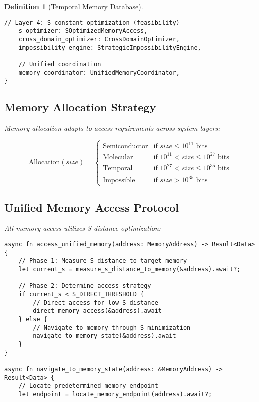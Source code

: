 \documentclass[12pt]{article}
\newtheorem{definition}[theorem]{Definition}
\begin{document}
\begin{definition}[Temporal Memory Database]
\begin{lstlisting}[caption=Extended Memory System Architecture]
    // Layer 4: S-constant optimization (feasibility)
    s_optimizer: SOptimizedMemoryAccess,
    cross_domain_optimizer: CrossDomainOptimizer,
    impossibility_engine: StrategicImpossibilityEngine,
    
    // Unified coordination
    memory_coordinator: UnifiedMemoryCoordinator,
}
\end{lstlisting}

\subsection{Memory Allocation Strategy}

Memory allocation adapts to access requirements across system layers:

\begin{equation}
\text{Allocation}(size) = \begin{cases}
\text{Semiconductor} & \text{if } size \leq 10^{11} \text{ bits} \\
\text{Molecular} & \text{if } 10^{11} < size \leq 10^{27} \text{ bits} \\
\text{Temporal} & \text{if } 10^{27} < size \leq 10^{35} \text{ bits} \\
\text{Impossible} & \text{if } size > 10^{35} \text{ bits}
\end{cases}
\end{equation}

\subsection{Unified Memory Access Protocol}

All memory access utilizes S-distance optimization:

\begin{lstlisting}[caption=S-Optimized Memory Access]
async fn access_unified_memory(address: MemoryAddress) -> Result<Data> {
    // Phase 1: Measure S-distance to target memory
    let current_s = measure_s_distance_to_memory(&address).await?;
    
    // Phase 2: Determine access strategy
    if current_s < S_DIRECT_THRESHOLD {
        // Direct access for low S-distance
        direct_memory_access(&address).await
    } else {
        // Navigate to memory through S-minimization
        navigate_to_memory_state(&address).await
    }
}

async fn navigate_to_memory_state(address: &MemoryAddress) -> Result<Data> {
    // Locate predetermined memory endpoint
    let endpoint = locate_memory_endpoint(address).await?;
    

\end{lstlisting}
\end{definition}
\end{document}
